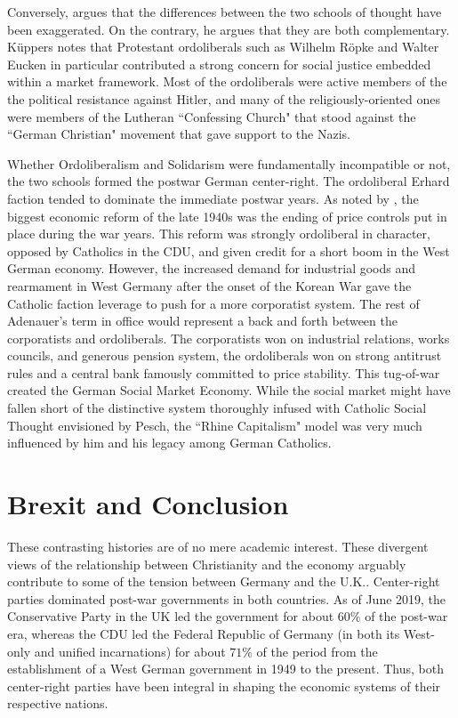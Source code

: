 \documentclass{article}
\begin{document}
Conversely, \citet{kuppers2015} argues that the differences between the two schools of thought have been exaggerated.  On the contrary, he argues that they are both complementary.  K\"{u}ppers notes that Protestant ordoliberals such as Wilhelm R\"{o}pke and Walter Eucken in particular contributed a strong concern for social justice embedded within a market framework.  Most of the ordoliberals were active members of the the political resistance against Hitler, and many of the religiously-oriented ones were members of the Lutheran ``Confessing Church" that stood against the ``German Christian" movement that gave support to the Nazis.\medskip

Whether Ordoliberalism and Solidarism were fundamentally incompatible or not, the two schools formed the postwar German center-right.  The ordoliberal Erhard faction tended to dominate the immediate postwar years.  As noted by \citet{hien2013}, the biggest economic reform of the late 1940s was the ending of price controls put in place during the war years.  This reform was strongly ordoliberal in character, opposed by Catholics in the CDU, and given credit for a short boom in the West German economy.  However, the increased demand for industrial goods and rearmament in West Germany after the onset of the Korean War gave the Catholic faction leverage to push for a more corporatist system.  The rest of Adenauer’s term in office would represent a back and forth between the corporatists and ordoliberals.  The corporatists won on industrial relations, works councils, and generous pension system, the ordoliberals won on strong antitrust rules and a central bank famously committed to price stability.  This tug-of-war created the German Social Market Economy.  While the social market might have fallen short of the distinctive system thoroughly infused with Catholic Social Thought envisioned by Pesch, the ``Rhine Capitalism" model was very much influenced by him and his legacy among German Catholics.

\section{Brexit and Conclusion}

These contrasting histories are of no mere academic interest.  These divergent views of the relationship between Christianity and the economy arguably contribute to some of the tension between Germany and the U.K..  Center-right parties dominated post-war governments in both countries.  As of June 2019, the Conservative Party in the UK led the government for about $ 60\% $ of the post-war era, whereas the CDU led the Federal Republic of Germany (in both its West-only and unified incarnations) for about $ 71\% $ of the period from the establishment of a West German government in 1949 to the present.  Thus, both center-right parties have been integral in shaping the economic systems of their respective nations.\medskip
\end{document}
